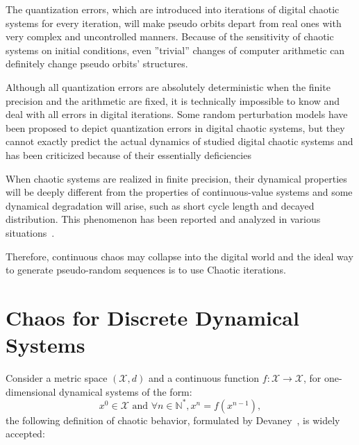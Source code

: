 The quantization errors, which are introduced into iterations of digital chaotic systems for every iteration, will make pseudo orbits depart from real ones with very complex and uncontrolled manners. Because of the sensitivity of chaotic systems on initial conditions, even ''trivial'' changes of computer arithmetic can definitely change pseudo orbits' structures.

Although all quantization errors are absolutely deterministic when the finite precision and the arithmetic are fixed, it is technically impossible to know and deal with all errors in digital iterations. Some random perturbation models have been proposed to depict quantization errors in digital chaotic systems, but they cannot exactly predict the actual dynamics of studied digital chaotic systems and has been criticized because of their essentially deficiencies


When chaotic systems are realized in finite precision, their dynamical properties will be deeply different from the properties of continuous-value systems and some dynamical degradation will arise, such as short cycle length and decayed distribution. This phenomenon has been reported and analyzed in various situations~\cite{Binder1986,Wheeler1989,Palmore1990,Blank1997,Li2005}.


Therefore, continuous chaos may collapse into the digital world and the ideal way to generate pseudo-random sequences is to use Chaotic iterations.




\section{Chaos for Discrete Dynamical Systems}

Consider a metric space $(\mathcal{X},d)$ and a continuous function $f:\mathcal{X}\longrightarrow \mathcal{X}$, for one-dimensional dynamical systems of the form:
\begin{equation}
x^0 \in \mathcal{X} \textrm{  and } \forall n \in \mathds{N}^*, x^n=f(x^{n-1}),
\label{Devaney}
\end{equation}
the following definition of chaotic behavior, formulated by Devaney~\cite{Dev89}, is widely accepted:

